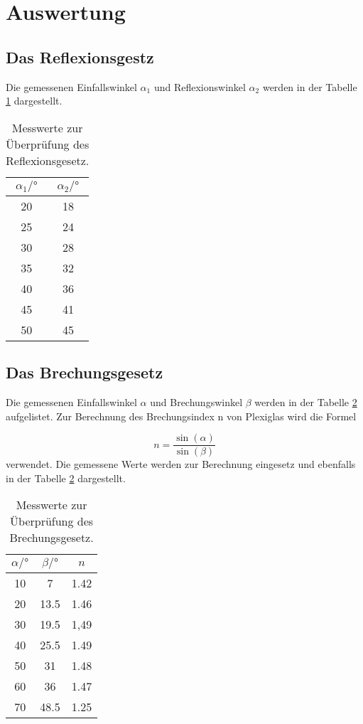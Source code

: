 \section{Auswertung}
\label{sec:Auswertung}

\subsection{Das Reflexionsgestz}
\label{sec:Reflexionsgesetz}

Die gemessenen Einfallswinkel $\alpha_1$ und Reflexionswinkel $\alpha_2$ werden in der Tabelle \ref{tab:Ref} dargestellt.

\begin{table}[H]
  \centering
  \caption{Messwerte zur Überprüfung des Reflexionsgesetz.}
  \label{tab:Ref}
  \begin{tabular}{c c}
    \toprule
    $\alpha_1 /°$ & $\alpha_2 /°$ \\
    \midrule
    20 & 18 \\
    25 & 24 \\
    30 & 28 \\
    35 & 32 \\
    40 & 36 \\
    45 & 41 \\
    50 & 45 \\
    \bottomrule
  \end{tabular}
\end{table}

\subsection{Das Brechungsgesetz}
\label{sec:Brechungsgesetz}

Die gemessenen Einfallswinkel $\alpha$ und Brechungswinkel $\beta$ werden in der Tabelle \ref{tab:Bre} aufgelistet.
Zur Berechnung des Brechungsindex n von Plexiglas wird die Formel

\begin{equation}
  \label{eq:B}
  n = \frac{\sin(\alpha)}{\sin(\beta)}
\end{equation}
verwendet.
Die gemessene Werte werden zur Berechnung eingesetz und ebenfalls in der Tabelle \ref{tab:Bre} dargestellt.

\begin{table}[H]
  \centering
  \caption{Messwerte zur Überprüfung des Brechungsgesetz.}
  \label{tab:Bre}
  \begin{tabular}{c c c}
    \toprule
    $\alpha /°$ & $\beta /°$ & $n$\\
    \midrule
    10 & 7    & 1.42 \\
    20 & 13.5 & 1.46\\
    30 & 19.5 & 1,49\\
    40 & 25.5 & 1.49\\
    50 & 31   & 1.48\\
    60 & 36   & 1.47\\
    70 & 48.5 & 1.25\\
    \bottomrule
  \end{tabular}
\end{table}

